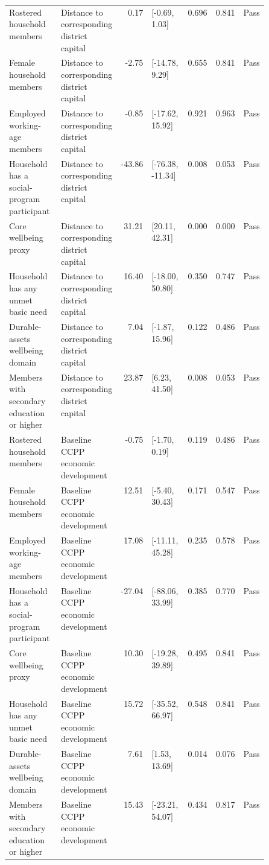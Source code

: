\begin{longtable}{@{}p{0.20\linewidth}p{0.16\linewidth}rp{0.14\linewidth}rrl@{}}
Rostered household members & Distance to corresponding district capital & 0.17 & [-0.69, 1.03] & 0.696 & 0.841 & Pass \\
Female household members & Distance to corresponding district capital & -2.75 & [-14.78, 9.29] & 0.655 & 0.841 & Pass \\
Employed working-age members & Distance to corresponding district capital & -0.85 & [-17.62, 15.92] & 0.921 & 0.963 & Pass \\
Household has a social-program participant & Distance to corresponding district capital & -43.86 & [-76.38, -11.34] & 0.008 & 0.053 & Pass \\
Core wellbeing proxy & Distance to corresponding district capital & 31.21 & [20.11, 42.31] & 0.000 & 0.000 & Pass \\
Household has any unmet basic need & Distance to corresponding district capital & 16.40 & [-18.00, 50.80] & 0.350 & 0.747 & Pass \\
Durable-assets wellbeing domain & Distance to corresponding district capital & 7.04 & [-1.87, 15.96] & 0.122 & 0.486 & Pass \\
Members with secondary education or higher & Distance to corresponding district capital & 23.87 & [6.23, 41.50] & 0.008 & 0.053 & Pass \\
Rostered household members & Baseline CCPP economic development & -0.75 & [-1.70, 0.19] & 0.119 & 0.486 & Pass \\
Female household members & Baseline CCPP economic development & 12.51 & [-5.40, 30.43] & 0.171 & 0.547 & Pass \\
Employed working-age members & Baseline CCPP economic development & 17.08 & [-11.11, 45.28] & 0.235 & 0.578 & Pass \\
Household has a social-program participant & Baseline CCPP economic development & -27.04 & [-88.06, 33.99] & 0.385 & 0.770 & Pass \\
Core wellbeing proxy & Baseline CCPP economic development & 10.30 & [-19.28, 39.89] & 0.495 & 0.841 & Pass \\
Household has any unmet basic need & Baseline CCPP economic development & 15.72 & [-35.52, 66.97] & 0.548 & 0.841 & Pass \\
Durable-assets wellbeing domain & Baseline CCPP economic development & 7.61 & [1.53, 13.69] & 0.014 & 0.076 & Pass \\
Members with secondary education or higher & Baseline CCPP economic development & 15.43 & [-23.21, 54.07] & 0.434 & 0.817 & Pass \\

\end{longtable}
